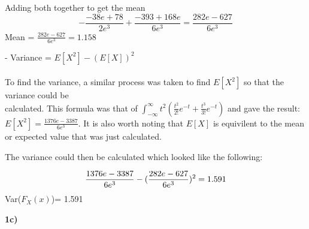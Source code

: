 \documentclass[oneside, a4paper]{article}
\begin{document}
Adding both together to get the mean
\begin{equation}
-\frac{-38e+78}{2e^3}+\frac{-393+168e}{6e^3} = \frac{282e-627}{6e^3}
\end{equation}
Mean  = $\frac{282e-627}{6e^3} = 1.158$

- Variance = $E[X^2] - (E[X])^2$ \\ \\
To find the variance, a similar process was taken to find $E[X^2]$ so that the variance could be \\
calculated. This formula was that of $\int _{-\infty}^{\infty} t^2 \left(\frac{t^2}{2!} e^{-t} + \frac{t^3}{3!} e^{-t}\right)$ and gave the result: \\
$E[X^2] = \frac{1376e-3387}{6e^3}$. It is also worth noting that $E[X]$ is equivilent to the mean or expected value that was just calculated.

The variance could then be calculated which looked like the following:

\begin{equation}
    \frac{1376e-3387}{6e^3} - (\frac{282e-627}{6e^3})^2 \\
    = 1.591
\end{equation}
Var($F_X(x)$)= 1.591

\textbf{1c)} 
\end{document}
